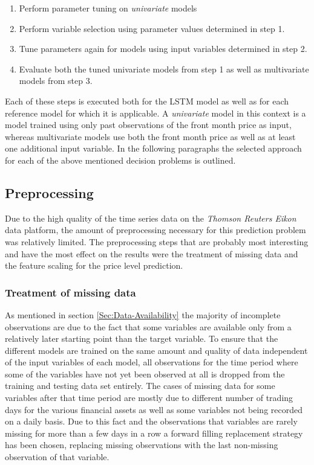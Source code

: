 \begin{enumerate}
\item Perform parameter tuning on \textit{univariate} models
\item Perform variable selection using parameter values determined in step 1.
\item Tune parameters again for models using input variables determined in step 2.
\item Evaluate both the tuned univariate models from step 1 as well as multivariate models from step 3. 
\end{enumerate}
Each of these steps is executed both for the LSTM model as well as for each reference model for which it is applicable.
A \textit{univariate} model in this context is a model trained using only past observations of the front month price as input, whereas multivariate models use both the front month price as well as at least one additional input variable. In the following paragraphs the selected approach for each of the above mentioned decision problems is outlined.

\subsection{Preprocessing}
Due to the high quality of the time series data on the \textit{Thomson Reuters Eikon} data platform, the amount of preprocessing necessary for this prediction problem was relatively limited. The preprocessing steps that are probably most interesting and have the most effect on the results were the treatment of missing data and the feature scaling for the price level prediction.
\subsubsection{Treatment of missing data}
As mentioned in section \ref{Sec:Data-Availability} the majority of incomplete observations are due to the fact that some variables are available only from a relatively later starting point than the target variable. To ensure that the different models are trained on the same amount and quality of data independent of the input variables of each model, all observations for the time period where some of the variables have not yet been observed at all is dropped from the training and testing data set entirely. The cases of missing data for some variables after that time period are mostly due to different number of trading days for the various financial assets as well as some variables not being recorded on a daily basis. Due to this fact and the observations that variables are rarely missing for more than a few days in a row a forward filling replacement strategy has been chosen, replacing missing observations with the last non-missing observation of that variable.
